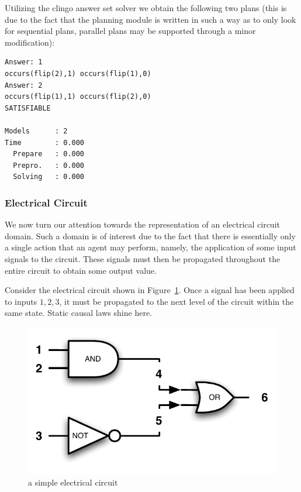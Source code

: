 \documentclass{article}
\begin{document}
\noindent Utilizing the clingo answer set solver we obtain the following two plans (this is due to the fact that the planning module is written in such a way as to only look for sequential plans, parallel plans may be supported through a minor modification):
\begin{verbatim}
Answer: 1
occurs(flip(2),1) occurs(flip(1),0) 
Answer: 2
occurs(flip(1),1) occurs(flip(2),0) 
SATISFIABLE

Models      : 2     
Time        : 0.000
  Prepare   : 0.000
  Prepro.   : 0.000
  Solving   : 0.000
\end{verbatim}

\subsubsection{Electrical Circuit}

We now turn our attention towards the representation of an electrical circuit domain. Such a domain is of interest due to the fact that there is essentially only a single action that an agent may perform, namely, the application of some input signals to the circuit. These signals must then be propagated throughout the entire circuit to obtain some output value.

Consider the electrical circuit shown in Figure~\ref{circuit}. Once a signal has been applied to inputs $1,2,3$, it must be propagated to the next level of the circuit within the same state. Static causal laws shine here.

\begin{figure}[htb]
    \centering
    \includegraphics[scale=0.50]{circuit}
    \caption{a simple electrical circuit}
    \label{circuit}
\end{figure}
\end{document}

